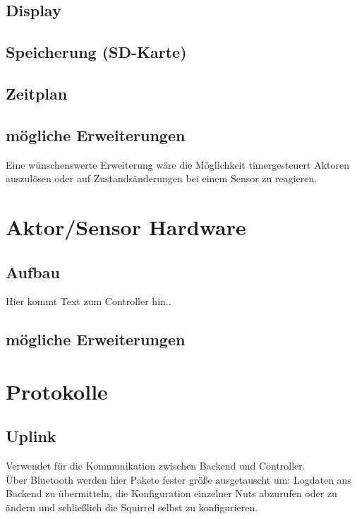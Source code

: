 \documentclass[12pt,a4paper]{article}
\begin{document}
\subsection{Display}



\subsection{Speicherung (SD-Karte)}

\subsection{Zeitplan}





\subsection{mögliche Erweiterungen}
Eine wünschenswerte Erweiterung wäre die Möglichkeit timergesteuert Aktoren auszulösen oder auf Zustandsänderungen bei einem Sensor zu reagieren.





\section{Aktor/Sensor Hardware}

\subsection{Aufbau}


Hier kommt Text zum Controller hin..

\subsection{mögliche Erweiterungen}


\section{Protokolle}

\subsection{Uplink}
\label{subsec:uplink}


Verwendet für die Kommunikation zwischen Backend und Controller.\\
Über Bluetooth werden hier Pakete fester größe ausgetauscht um: Logdaten ans Backend zu übermitteln, die Konfiguration einzelner Nuts abzurufen oder zu ändern und schließlich die Squirrel selbst zu konfigurieren.
\end{document}
